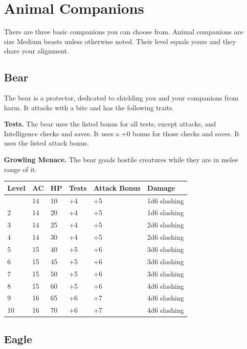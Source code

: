 \documentclass[12pt,letterpaper,twocolumn,openany,nodeprecatedcode,bg=none]{dndbook}
\begin{document}
\section{Animal Companions}\label{animal-companions}

There are three basic companions you can choose from. Animal companions
are size Medium beasts unless otherwise noted. Their level equals yours
and they share your alignment.

\subsection{Bear}\label{bear}

The bear is a protector, dedicated to shielding you and your companions
from harm. It attacks with a bite and has the following traits.

\textbf{Tests.} The bear uses the listed bonus for all tests, except
attacks, and Intelligence checks and saves. It uses a +0 bonus for those
checks and saves. It uses the listed attack bonus.

\textbf{Growling Menace.} The bear goads hostile creatures while they
are in melee range of it.

\begin{longtable}[]{@{}llllll@{}}
\toprule\noalign{}
Level & AC & HP & Tests & Attack Bonus & Damage \\
\midrule\noalign{}
\endhead
\bottomrule\noalign{}
\endlastfoot
1 & 14 & 10 & +4 & +5 & 1d6 slashing \\
2 & 14 & 20 & +4 & +5 & 1d6 slashing \\
3 & 14 & 25 & +4 & +5 & 2d6 slashing \\
4 & 14 & 30 & +4 & +5 & 2d6 slashing \\
5 & 15 & 40 & +5 & +6 & 3d6 slashing \\
6 & 15 & 45 & +5 & +6 & 3d6 slashing \\
7 & 15 & 50 & +5 & +6 & 3d6 slashing \\
8 & 15 & 60 & +5 & +6 & 4d6 slashing \\
9 & 16 & 65 & +6 & +7 & 4d6 slashing \\
10 & 16 & 70 & +6 & +7 & 4d6 slashing \\
\end{longtable}

\subsection{Eagle}\label{eagle}
\end{document}
